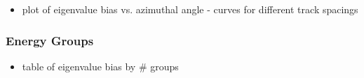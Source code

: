 \begin{itemize}
  \item plot of eigenvalue bias vs. azimuthal angle - curves for different track spacings
\end{itemize}

\subsubsection{Energy Groups}
\label{subsubsec:chap4-hetero-lattice-energy}

\begin{itemize}
  \item table of eigenvalue bias by \# groups
\end{itemize}
